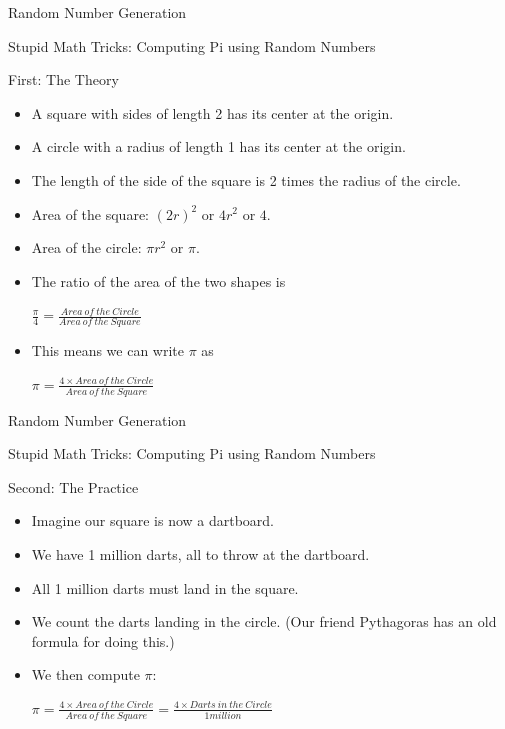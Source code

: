 \documentclass{beamer}
\begin{document}
\begin{frame}{Random Number Generation}

    Stupid Math Tricks: Computing Pi using Random Numbers

    First: The Theory

    \begin{itemize}
        \item A square with sides of length 2 has its center at the origin.
        \item A circle with a radius of length 1 has its center at the origin.
        \item The length of the side of the square is 2 times the radius of the circle. 
	\item Area of the square: $(2r)^2$ or $4r^2$ or $4$.
	\item Area of the circle: $\pi r^2$ or $\pi$.
	\item The ratio of the area of the two shapes is

	\begin{math}
	\frac{\pi}{4} = \frac{Area\:of\:the\:Circle}{Area\:of\:the\:Square}
	\end{math}

	\item This means we can write $\pi$ as

	\begin{math}
	\pi = \frac{4 \times Area\:of\:the\:Circle}{Area\:of\:the\:Square}
	\end{math}

    \end{itemize}
\end{frame}

\begin{frame}{Random Number Generation}

    Stupid Math Tricks: Computing Pi using Random Numbers

    Second: The Practice

    \begin{itemize}
        \item Imagine our square is now a dartboard.
	\item We have 1 million darts, all to throw at the dartboard.
	\item All 1 million darts must land in the square.
	\item We count the darts landing in the circle. (Our friend Pythagoras has an old formula for doing this.)
	\item We then compute $\pi$:

	\begin{math}
	\pi = \frac{4 \times Area\:of\:the\:Circle}{Area\:of\:the\:Square} = \frac{4 \times Darts\:in\:the\:Circle}{1 million}
	\end{math}

    \end{itemize}
\end{frame}
\end{document}
